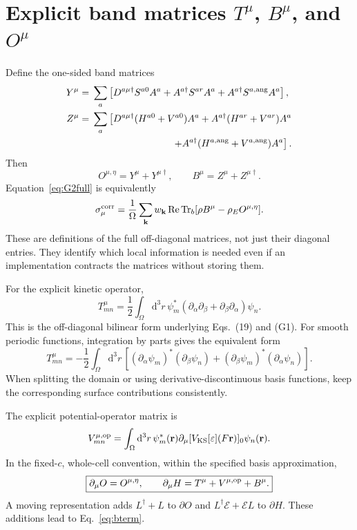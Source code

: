 \documentclass[11pt]{article}
\newcommand{\Tr}{\operatorname{Tr}}
\newcommand{\Rea}{\operatorname{Re}}
\newcommand{\dd}{\mathrm d}
\newcommand{\kb}{\mathbf k}
\newcommand{\pa}{\partial_\mu}
\newcommand{\Es}{\mathcal E}
\newcommand{\rE}{{\rho_E}}
\newcommand{\newpart}[1]{\par\Needspace{12\baselineskip}\section{#1}}
\begin{document}
\newpart{Explicit band matrices \texorpdfstring{$T^\mu$, $B^\mu$, and $O^\mu$}{T, B, and O}}
\label{sec:matrices}
Define the one-sided band matrices
\begin{align}
 Y^\mu={}&\sum_a\left[D^{a\mu\dagger}S^{a0}A^a
       +A^{a\dagger}S^{ar}A^a+A^{a\dagger}S^{a,\rm ang}A^a\right],\\
 Z^\mu={}&\sum_a\left[D^{a\mu\dagger}(H^{a0}+V^{a0})A^a
       +A^{a\dagger}(H^{ar}+V^{ar})A^a\right.\notag\\
       &\hspace{29mm}\left.+A^{a\dagger}(H^{a,\rm ang}
                                            +V^{a,\rm ang})A^a\right].
\end{align}
Then
\begin{equation}
 \boxed{O^{\mu,\eta}=Y^\mu+Y^{\mu\dagger},\qquad
        B^\mu=Z^\mu+Z^{\mu\dagger}.}
 \label{eq:BO}
\end{equation}
Equation~\eqref{eq:G2full} is equivalently
\begin{equation}
 \sigma_\mu^{\rm corr}=\frac1\Omega\sum_\kb w_\kb
 \Rea\Tr_b[\rho B^\mu-\rE O^{\mu,\eta}].
\end{equation}
These are definitions of the full off-diagonal matrices, not just their
diagonal entries. They identify which local information is needed even
if an implementation contracts the matrices without storing them.

For the explicit kinetic operator,
\begin{equation}
 T^\mu_{mn}=\frac12\int_\Omega\dd^3r\,
 \psi_m^*(\partial_\alpha\partial_\beta
                  +\partial_\beta\partial_\alpha)\psi_n.
 \label{eq:T}
\end{equation}
This is the off-diagonal bilinear form underlying Eqs.\ (19) and (G1).
For smooth periodic functions, integration by parts gives the equivalent
form
\begin{equation}
 T^\mu_{mn}=-\frac12\int_\Omega\dd^3r\,
 [(\partial_\alpha\psi_m)^*(\partial_\beta\psi_n)
  +(\partial_\beta\psi_m)^*(\partial_\alpha\psi_n)].
 \label{eq:Tgrad}
\end{equation}
When splitting the domain or using derivative-discontinuous basis
functions, keep the corresponding surface contributions consistently.

The explicit potential-operator matrix is
\begin{equation}
 V^{\mu,\rm op}_{mn}=
 \int_\Omega\dd^3r\,\psi_m^*(\mathbf r)
 \pa[V_{\rm KS}[\varepsilon](F\mathbf r)]_0\psi_n(\mathbf r).
\end{equation}
In the fixed-$c$, whole-cell convention, within the specified basis
approximation,
\begin{equation}
 \boxed{\pa O=O^{\mu,\eta},\qquad
        \pa H=T^\mu+V^{\mu,\rm op}+B^\mu.}
 \label{eq:matrixderivs}
\end{equation}
A moving representation adds $L^\dagger+L$ to $\partial O$ and
$L^\dagger\Es+\Es L$ to $\partial H$. These additions lead to
Eq.~\eqref{eq:bterm}.
\end{document}
